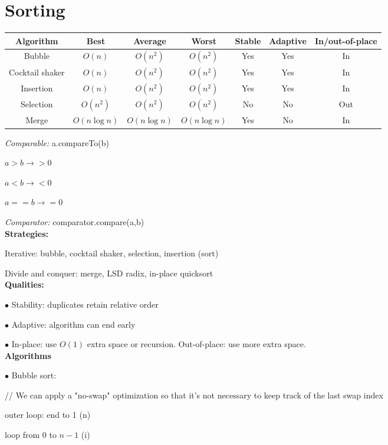 \documentclass{exam}
\begin{document}
    \section{Sorting}
    
    \begin{tabular}{c|cccccc}
        Algorithm&Best&Average&Worst&Stable&Adaptive&In/out-of-place\\
        \hline
        Bubble&$O(n)$&$O(n^2)$&$O(n^2)$&Yes&Yes&In\\
        Cocktail shaker&$O(n)$&$O(n^2)$&$O(n^2)$&Yes&Yes&In\\
        Insertion&$O(n)$&$O(n^2)$&$O(n^2)$&Yes&Yes&In\\
        Selection&$O(n^2)$&$O(n^2)$&$O(n^2)$&No&No&Out\\
        Merge&$O(n \log n)$&$O(n \log n)$&$O(n \log n)$&Yes&No&In
    \end{tabular}

    \textit{Comparable:} a.compareTo(b)
    
    $a > b \rightarrow > 0$
    
    $a < b \rightarrow < 0$
    
    $a == b \rightarrow = 0$
    
    \textit{Comparator:} comparator.compare(a,b)\\
    
    \textbf{Strategies:}
    
    Iterative: bubble, cocktail shaker, selection, insertion (sort)
    
    Divide and conquer: merge, LSD radix, in-place quicksort\\
    
    \textbf{Qualities:}
    
    $\bullet$ Stability: duplicates retain relative order
    
    $\bullet$ Adaptive: algorithm can end early
    
    $\bullet$ In-place: use $O(1)$ extra space or recursion. Out-of-place: use more extra space.\\
    
    \textbf{Algorithms}
    
    $\bullet$ Bubble sort:
    
    // We can apply a "no-swap" optimization so that it's not necessary to keep track of the last swap index
    
    outer loop: end to 1 (n)
    
    \qquad loop from 0 to $n-1$ (i)
    
\end{document}
